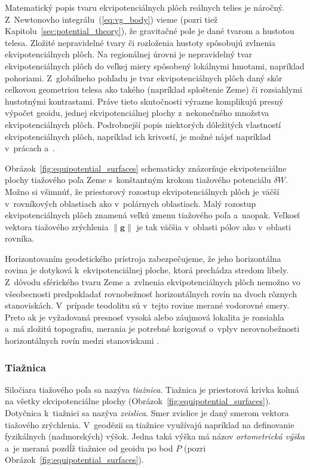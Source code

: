 \documentclass[a4paper,12pt]{book}
\let\vec\mathbf
\begin{document}
Matematický popis tvaru ekvipotenciálnych plôch reálnych telies je náročný.  
Z~Newtonovho integrálu~(\ref{eq:vg_body}) vieme (pozri tiež 
Kapitolu~\ref{sec:potential_theory}), že gravitačné pole je dané tvarom 
a hustotou telesa.  Zložité nepravidelné tvary či rozloženia hustoty spôsobujú 
zvlnenia ekvipotenciálnych plôch.  Na regionálnej úrovni je nepravidelný tvar 
ekvipotenciálnych plôch do veľkej miery spôsobený lokálnymi hmotami, napríklad 
pohoriami.  Z~globálneho pohľadu je tvar ekvipotenciálnych plôch daný skôr 
celkovou geometriou telesa ako takého (napríklad sploštenie Zeme) či 
rozsiahlymi hustotnými kontrastami.  Práve tieto skutočnosti výrazne komplikujú 
presný výpočet geoidu, jednej ekvipotenciálnej plochy z~nekonečného množstva 
ekvipotenciálnych plôch.  Podrobnejší popis niektorých dôležitých vlastností 
ekvipotenciálnych plôch, napríklad ich krivostí, je možné nájsť napríklad 
v~prácach \textcite{Janak2006} a~\textcite{MoritzPhysicalGeodesy}.

Obrázok~\ref{fig:equipotential_surfaces} schematicky znázorňuje ekvipotenciálne
plochy tiažového poľa Zeme s~konštantným krokom tiažového potenciálu $\delta
W$.  Možno si všimnúť, že priestorový rozostup ekvipotenciálnych plôch je väčší
v~rovníkových oblastiach ako v~polárnych oblastiach.  Malý rozostup
ekvipotenciálnych plôch znamená veľkú zmenu tiažového poľa a~naopak.  Veľkosť
vektora tiažového zrýchlenia $\| \vec g \|$ je tak väčšia v~oblasti pólov ako
v~oblasti rovníka.

Horizontovaním geodetického prístroja zabezpečujeme, že jeho horizontálna
rovina je dotyková k~ekvipotenciálnej ploche, ktorá prechádza stredom libely.
Z~dôvodu sférického tvaru Zeme a~zvlnenia ekvipotenciálnych plôch nemožno vo
všeobecnosti predpokladať rovnobežnosť horizontálnych rovín na dvoch rôznych
stanoviskách.  V~prípade teodolitu sú v~tejto rovine merané vodorovné smery.
Preto ak je vyžadovaná presnosť vysoká alebo záujmová lokalita je rozsiahla
a~má zložitú topografiu,  merania je potrebné korigovať o~vplyv nerovnobežnosti
horizontálnych rovín medzi stanoviskami \parencite[pozri 
napríklad][]{VanicekGeodesy}.

\subsubsection{Tiažnica}

Siločiara tiažového poľa sa nazýva \emph{tiažnica}.  Tiažnica je priestorová
krivka kolmá na všetky ekvipotenciálne plochy
(Obrázok~\ref{fig:equipotential_surfaces}).  Dotyčnica k~tiažnici sa nazýva
\emph{zvislica}.  Smer zvislice je daný smerom vektora tiažového zrýchlenia.
V~geodézii sa tiažnice využívajú napríklad na definovanie fyzikálnych
(nadmorských) výšok.  Jedna taká výška má názov \emph{ortometrická výška} a~je
meraná pozdĺž tiažnice od geoidu po bod $P$ (pozri
Obrázok~\ref{fig:equipotential_surfaces}).
\end{document}
